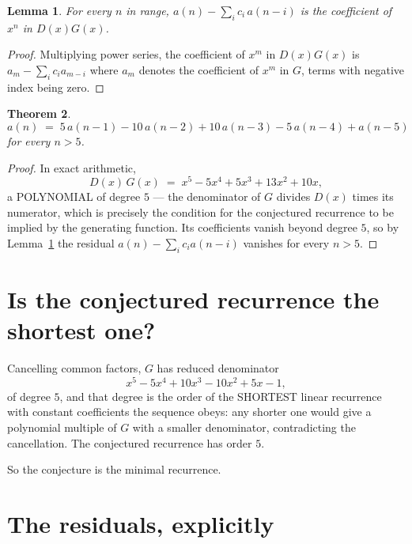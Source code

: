 \documentclass[11pt,a4paper]{article}
\theoremstyle{plain}
\newtheorem{theorem}{Theorem}
\newtheorem{lemma}[theorem]{Lemma}
\theoremstyle{definition}
\begin{document}
\begin{lemma}\label{lem:key}
For every $n$ in range, $a(n)-\sum_i c_i\,a(n-i)$ is the coefficient of $x^{n}$ in
$D(x)G(x)$.
\end{lemma}

\begin{proof}
Multiplying power series, the coefficient of $x^{m}$ in $D(x)G(x)$ is
$a_m-\sum_i c_i a_{m-i}$ where $a_m$ denotes the coefficient of $x^{m}$ in $G$, terms with
negative index being zero.
\end{proof}

\begin{theorem}
\[
a(n)\;=\;5\,a(n-1) - 10\,a(n-2) + 10\,a(n-3) - 5\,a(n-4) + a(n-5)
\]
for every $n>5$.
\end{theorem}

\begin{proof}
In exact arithmetic,
\[
D(x)\,G(x)\;=\;x^{5} - 5 x^{4} + 5 x^{3} + 13 x^{2} + 10 x,
\]
a POLYNOMIAL of degree $5$ --- the denominator of $G$ divides $D(x)$ times its numerator,
which is precisely the condition for the conjectured recurrence to be implied by the
generating function. Its coefficients vanish beyond degree $5$, so by
Lemma~\ref{lem:key} the residual $a(n)-\sum_ic_ia(n-i)$ vanishes for every
$n>5$.
\end{proof}

\section{Is the conjectured recurrence the shortest one?}

Cancelling common factors, $G$ has reduced denominator
\[
x^{5} - 5 x^{4} + 10 x^{3} - 10 x^{2} + 5 x - 1,
\]
of degree $5$, and that degree is the order of the SHORTEST linear recurrence with
constant coefficients the sequence obeys: any shorter one would give a polynomial multiple of
$G$ with a smaller denominator, contradicting the cancellation. The conjectured recurrence has
order $5$.

So the conjecture is the minimal recurrence.

\section{The residuals, explicitly}
\end{document}

